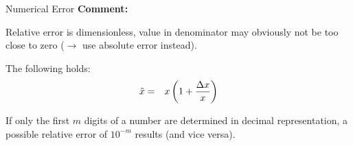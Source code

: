 \documentclass[11pt,compress,t,notes=noshow, xcolor=table]{beamer}
\begin{document}
\begin{vbframe}{Numerical Error}
\textbf{Comment:}

Relative error is dimensionless, value in denominator
may obviously not be too close to zero ($\to$ use absolute error instead).


\framebreak

The following holds:
\begin{eqnarray*}
  \label{eq:1}
  \tilde x &=& x \left(1+\frac{\Delta x}{x}\right)
\end{eqnarray*}

If only the first $m$ digits of a number are determined in decimal representation,
a possible relative error of $10^{-m}$ results (and vice versa).

\framebreak









\end{vbframe}
\end{document}
